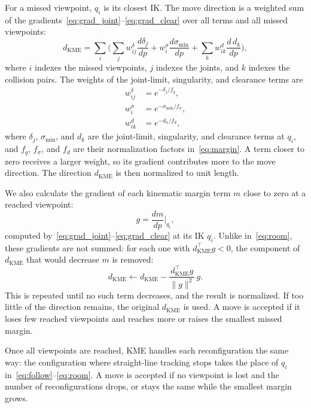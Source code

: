 \documentclass[letterpaper, journal, twoside]{IEEEtran}
\begin{document}
For a missed viewpoint, $q_i$ is its closest IK. The move direction is a weighted sum of the gradients~\eqref{eq:grad_joint}--\eqref{eq:grad_clear} over all terms and all missed viewpoints:
\begin{equation}
d_{\text{KME}} = \sum_{i} \Big( \sum_j w^{\delta}_{ij} \frac{d\delta_j}{dp} + w^{\sigma}_{i} \frac{d\sigma_{\min}}{dp} + \sum_k w^{d}_{ik} \frac{d\,d_k}{dp} \Big),
\label{eq:room}
\end{equation}
where $i$ indexes the missed viewpoints, $j$ indexes the joints, and $k$ indexes the collision pairs. The weights of the joint-limit, singularity, and clearance terms are
\begin{equation}
\begin{aligned}
w^{\delta}_{ij} &= e^{-\delta_j / f_q},\\
w^{\sigma}_{i} &= e^{-\sigma_{\min} / f_\sigma},\\
w^{d}_{ik} &= e^{-d_k / f_d},
\end{aligned}
\label{eq:weights}
\end{equation}
where $\delta_j$, $\sigma_{\min}$, and $d_k$ are the joint-limit, singularity, and clearance terms at $q_i$, and $f_q$, $f_\sigma$, and $f_d$ are their normalization factors in~\eqref{eq:margin}. A term closer to zero receives a larger weight, so its gradient contributes more to the move direction. The direction $d_{\text{KME}}$ is then normalized to unit length.

We also calculate the gradient of each kinematic margin term $m$ close to zero at a reached viewpoint:
\begin{equation}
g = \frac{dm}{dp}\Big|_{q_i},
\label{eq:hurt}
\end{equation}
computed by~\eqref{eq:grad_joint}--\eqref{eq:grad_clear} at its IK $q_i$. Unlike in~\eqref{eq:room}, these gradients are not summed: for each one with $d_{\text{KME}}^\top g < 0$, the component of $d_{\text{KME}}$ that would decrease $m$ is removed:
\begin{equation}
d_{\text{KME}} \leftarrow d_{\text{KME}} - \frac{d_{\text{KME}}^\top g}{\|g\|^2}\, g.
\label{eq:project}
\end{equation}
This is repeated until no such term decreases, and the result is normalized. If too little of the direction remains, the original $d_{\text{KME}}$ is used. A move is accepted if it loses few reached viewpoints and reaches more or raises the smallest missed margin.

Once all viewpoints are reached, KME handles each reconfiguration the same way: the configuration where straight-line tracking stops takes the place of $q_i$ in~\eqref{eq:follow}--\eqref{eq:room}. A move is accepted if no viewpoint is lost and the number of reconfigurations drops, or stays the same while the smallest margin grows.
\end{document}
